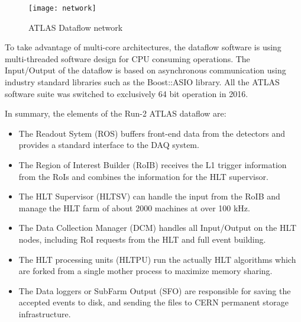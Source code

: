 \begin{figure}[t!]
\centering
\texttt{[image: network]} 
\vspace{-1cm}
\caption{ATLAS Dataflow network}
\label{fig:net_diagram}
\end{figure} 

To take advantage of multi-core architectures, the dataflow
 software is using multi-threaded software design for CPU consuming operations.
The Input/Output of the dataflow is based on asynchronous communication using industry standard libraries
such as the Boost::ASIO library. All the ATLAS software suite was switched to exclusively 64 bit operation in 2016.



In summary, the elements of the Run-2 ATLAS dataflow are:

\begin{itemize}
\item The Readout Sytem (ROS) buffers front-end data from the detectors and provides a standard interface to the DAQ system.
\item The Region of Interest Builder (RoIB) receives the L1 trigger information from the RoIs and combines the information for the HLT supervisor.
\item The HLT Supervisor (HLTSV) can handle the input from the RoIB and manage the HLT farm of about 2000 machines at over 100 kHz.
\item The Data Collection Manager (DCM) handles all Input/Output on the HLT nodes, including RoI requests from the HLT and full event building.
\item The HLT processing units (HLTPU) run the actually HLT algorithms which 
are forked from a single mother process to maximize memory sharing.
\item The Data loggers or SubFarm Output (SFO) are responsible for saving the 
accepted events to disk, and sending the files to CERN permanent storage infrastructure.
\end{itemize}



